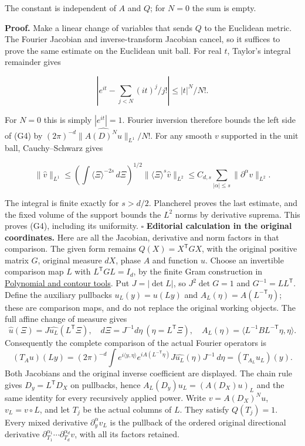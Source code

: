 \documentclass[
  11pt,
]{article}
\begin{document}
The constant is independent of \(A\) and \(Q\); for \(N=0\) the sum is
empty.

\textbf{Proof.} Make a linear change of variables that sends \(Q\) to
the Euclidean metric. The Fourier Jacobian and inverse-transform
Jacobian cancel, so it suffices to prove the same estimate on the
Euclidean unit ball. For real \(t\), Taylor's integral remainder gives

\[
\left|e^{it}-\sum_{j<N}(it)^j/j!\right|\leq |t|^N/N!.
\]

For \(N=0\) this is simply \(|e^{it}|=1\). Fourier inversion therefore
bounds the left side of (G4) by
\((2\pi)^{-d}\|\widehat{A(D)^Nu}\|_{L^1}/N!\). For any smooth \(v\)
supported in the unit ball, Cauchy--Schwarz gives

\[
\|\widehat v\|_{L^1}
\leq \left(\int\langle\Xi\rangle^{-2s}\,d\Xi\right)^{1/2}
\|\langle\Xi\rangle^s\widehat v\|_{L^2}
\leq C_{d,s}\sum_{|\alpha|\leq s}\|\partial^\alpha v\|_{L^2}.
\]

The integral is finite exactly for \(s>d/2\). Plancherel proves the last
estimate, and the fixed volume of the support bounds the \(L^2\) norms
by derivative suprema. This proves (G4), including its uniformity. \(\square\)
\textbf{Editorial calculation in the original coordinates.} Here are all
the Jacobian, derivative and norm factors in that comparison. The given
form remains \(Q(X)=X^{\mathsf T}GX\), with the original positive matrix
\(G\), original measure \(dX\), phase \(A\) and function \(u\). Choose
an invertible comparison map \(L\) with \(L^{\mathsf T}GL=I_d\), by the
finite Gram construction in
\href{stable-prerequisite-bridges.pdf}{Polynomial and contour tools}. Put
\(J=|\det L|\), so \(J^2\det G=1\) and \(G^{-1}=LL^{\mathsf T}\). Define
the auxiliary pullbacks \(u_L(y)=u(Ly)\) and
\(A_L(\eta)=A(L^{-\mathsf T}\eta)\); these are comparison maps, and do
not replace the original working objects. The full affine change of
measure gives \[
 \widehat u(\Xi)=J\widehat{u_L}(L^{\mathsf T}\Xi),\quad
 d\Xi=J^{-1}d\eta\ (\eta=L^{\mathsf T}\Xi),\quad
 A_L(\eta)=\langle L^{-1}BL^{-\mathsf T}\eta,\eta\rangle.
 \tag{GJ1}
\] Consequently the complete comparison of the actual Fourier operators
is \[
 (T_Au)(Ly)=(2\pi)^{-d}\int e^{i\langle y,\eta\rangle}
 e^{iA(L^{-\mathsf T}\eta)}J\widehat{u_L}(\eta)J^{-1}\,d\eta
 =(T_{A_L}u_L)(y).
 \tag{GJ2}
\] Both Jacobians and the original inverse coefficient are displayed.
The chain rule gives \(D_y=L^{\mathsf T}D_X\) on pullbacks, hence
\(A_L(D_y)u_L=(A(D_X)u)_L\) and the same identity for every recursively
applied power. Write \(v=A(D_X)^Nu\), \(v_L=v\circ L\), and let \(T_j\)
be the actual columns of \(L\). They satisfy \(Q(T_j)=1\). Every mixed
derivative \(\partial_y^\alpha v_L\) is the pullback of the ordered
original directional derivative
\(\partial_{T_1}^{\alpha_1}\cdots\partial_{T_d}^{\alpha_d}v\), with all
its factors retained.
\end{document}
